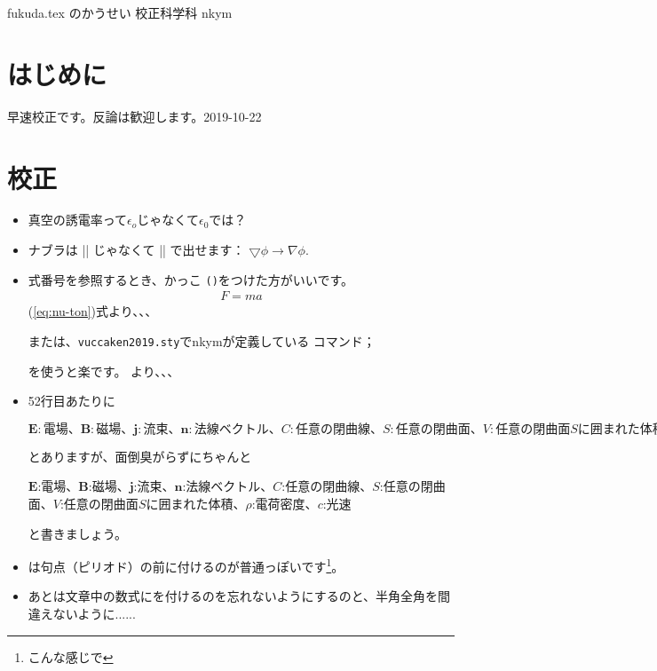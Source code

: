 \documentclass[10pt,b5paper,papersize,dvipdfmx]{jsbook}
\begin{document}
\kaishititle%
  {fukuda.tex のかうせい}%
  {校正科学科}%
  {nkym}%

\section*{はじめに}
早速校正です。反論は歓迎します。2019-10-22

\section{校正}

\begin{itemize}
  \item 真空の誘電率って$\epsilon_o$じゃなくて$\epsilon_0$では？
  \item ナブラは \code|\bigtriangledown| じゃなくて \code|\nabla| で出せます：
    $\bigtriangledown \phi \to \nabla \phi$.
  \item 式番号を参照するとき、かっこ \texttt{()}をつけた方がいいです。
    \ex
    \begin{align}
      F = ma \label{eq:nu-ton}
    \end{align}
    (\ref{eq:nu-ton})式より、、、\par
    または、\texttt{vuccaken2019.sty}でnkymが定義している \code{\siki} コマンド；
    \begin{metatex}[gobble=6]
      \newcommand\siki[1]{(\ref{eq:#1})}
    \end{metatex}
    を使うと楽です。
    \ex {}より、、、
  \item 52行目あたりに
    \begin{metatex}[gobble=6]
      $\mathbf{E}:電場、\mathbf{B}:磁場、\mathbf{j}:流束、\mathbf{n}:法線ベクトル、C:任意の閉曲線、S:任意の閉曲面、V:任意の閉曲面Sに囲まれた体積、\rho :電荷密度、c:光速$
    \end{metatex}
    とありますが、面倒臭がらずにちゃんと
    \begin{metatex}[gobble=6]
      $\mathbf{E}$:電場、$\mathbf{B}$:磁場、$\mathbf{j}$:流束、$\mathbf{n}$:法線ベクトル、$C$:任意の閉曲線、$S$:任意の閉曲面、$V$:任意の閉曲面$S$に囲まれた体積、$\rho$:電荷密度、$c$:光速
    \end{metatex}
    と書きましょう。
  \item \code{\footnote}は句点（ピリオド）の前に付けるのが普通っぽいです\footnote{こんな感じで}。
  \item あとは文章中の数式に\code{$ $}を付けるのを忘れないようにするのと、半角全角を間違えないように......
\end{itemize}
\end{document}

